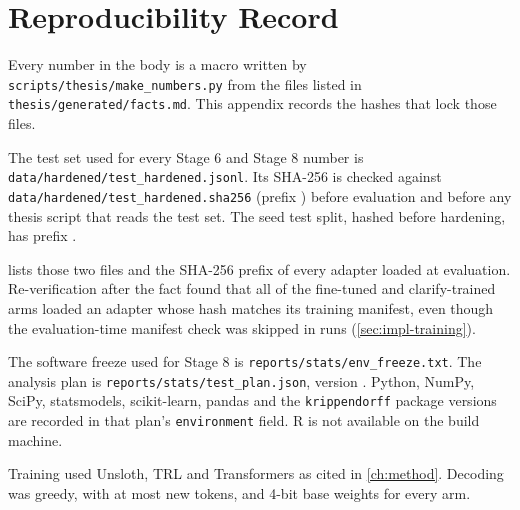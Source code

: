 \chapter{Reproducibility Record}
\label{app:G}
\label{app:repro}

Every number in the body is a macro written by \texttt{scripts/thesis/make\_numbers.py} from the files listed in \texttt{thesis/generated/facts.md}. This appendix records the hashes that lock those files.

The test set used for every Stage 6 and Stage 8 number is \texttt{data/hardened/test\_hardened.jsonl}. Its SHA-256 is checked against \texttt{data/hardened/test\_hardened.sha256} (prefix \TestShaShort) before evaluation and before any thesis script that reads the test set. The seed test split, hashed before hardening, has prefix \SeedTestShaShort.

 lists those two files and the SHA-256 prefix of every adapter loaded at evaluation. Re-verification after the fact found that all \AdapterArmsPass{} of the \AdapterArms{} fine-tuned and clarify-trained arms loaded an adapter whose hash matches its training manifest, even though the evaluation-time manifest check was skipped in \ManifestCheckSkippedRuns{} runs (\cref{sec:impl-training}).



The software freeze used for Stage 8 is \texttt{reports/stats/env\_freeze.txt}. The analysis plan is \texttt{reports/stats/test\_plan.json}, version \PlanVersion. Python, NumPy, SciPy, statsmodels, scikit-learn, pandas and the \texttt{krippendorff} package versions are recorded in that plan's \texttt{environment} field. R is not available on the build machine.

Training used Unsloth, TRL and Transformers as cited in \cref{ch:method}. Decoding was greedy, with at most \GenMaxNewTokens{} new tokens, and 4-bit base weights for every arm.
